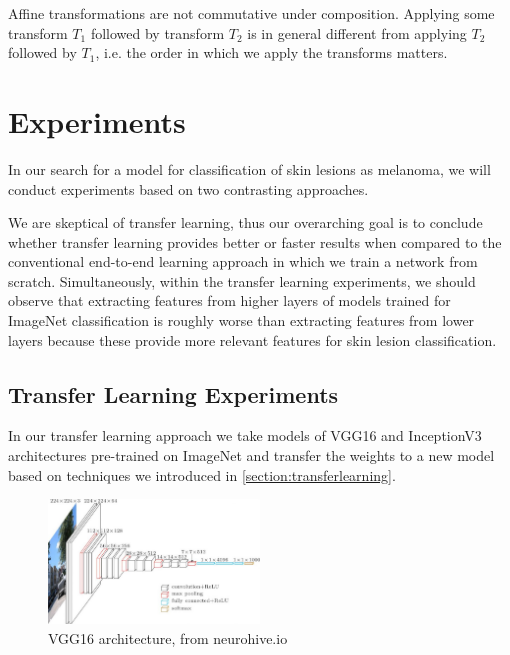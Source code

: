 Affine transformations are not commutative under composition. Applying some transform $T_1$ followed by transform $T_2$ is in general different from applying $T_2$ followed by $T_1$, i.e. the order in which we apply the transforms matters.

\section{Experiments}
\label{section:experiments}

In our search for a model for classification of skin lesions as melanoma, we will conduct experiments based on two contrasting approaches.

We are skeptical of transfer learning, thus our overarching goal is to conclude whether transfer learning provides better or faster results when compared to the conventional end-to-end learning approach in which we train a network from scratch. Simultaneously, within the transfer learning experiments, we should observe that extracting features from higher layers of models trained for ImageNet\cite{imagenet} classification is roughly worse than extracting features from lower layers because these provide more relevant features for skin lesion classification.

\subsection{Transfer Learning Experiments}
\label{subsection:transferlearningexperiments}

In our transfer learning approach we take models of VGG16 \cite{vgg16} and InceptionV3\cite{inceptionv2_3} architectures pre-trained on ImageNet \cite{imagenet} and transfer the weights to a new model based on techniques we introduced in \ref{section:transferlearning}.

\begin{figure}[h]
    \centering
    \includegraphics[width=0.5\textwidth]{figs/vgg16.jpg}
    \caption{VGG16 architecture, from neurohive.io}
    \label{fig:vgg16}
\end{figure}

